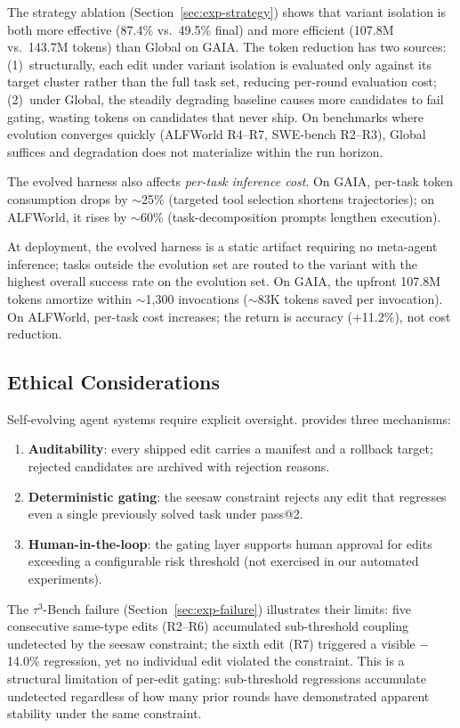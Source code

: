 The strategy ablation (Section~\ref{sec:exp-strategy}) shows that variant isolation is both more effective (87.4\% vs.\ 49.5\% final) and more efficient (107.8M vs.\ 143.7M tokens) than Global on GAIA. The token reduction has two sources: (1)~structurally, each edit under variant isolation is evaluated only against its target cluster rather than the full task set, reducing per-round evaluation cost; (2)~under Global, the steadily degrading baseline causes more candidates to fail gating, wasting tokens on candidates that never ship. On benchmarks where evolution converges quickly (ALFWorld R4--R7, SWE-bench R2--R3), Global suffices and degradation does not materialize within the run horizon.

The evolved harness also affects \textit{per-task inference cost}. On GAIA, per-task token consumption drops by ${\sim}$25\% (targeted tool selection shortens trajectories); on ALFWorld, it rises by ${\sim}$60\% (task-decomposition prompts lengthen execution).

At deployment, the evolved harness is a static artifact requiring no meta-agent inference; tasks outside the evolution set are routed to the variant with the highest overall success rate on the evolution set. On GAIA, the upfront 107.8M tokens amortize within ${\sim}$1{,}300 invocations (${\sim}$83K tokens saved per invocation). On ALFWorld, per-task cost increases; the return is accuracy (+11.2\%), not cost reduction.

\subsection{Ethical Considerations}

Self-evolving agent systems require explicit oversight. \ProjectName provides three mechanisms:
\begin{enumerate}
  \item \textbf{Auditability}: every shipped edit carries a manifest and a rollback target; rejected candidates are archived with rejection reasons.
  \item \textbf{Deterministic gating}: the seesaw constraint rejects any edit that regresses even a single previously solved task under pass@2.
  \item \textbf{Human-in-the-loop}: the gating layer supports human approval for edits exceeding a configurable risk threshold (not exercised in our automated experiments).
\end{enumerate}
The $\tau^3$-Bench failure (Section~\ref{sec:exp-failure}) illustrates their limits: five consecutive same-type edits (R2--R6) accumulated sub-threshold coupling undetected by the seesaw constraint; the sixth edit (R7) triggered a visible $-$14.0\% regression, yet no individual edit violated the constraint. This is a structural limitation of per-edit gating: sub-threshold regressions accumulate undetected regardless of how many prior rounds have demonstrated apparent stability under the same constraint.

